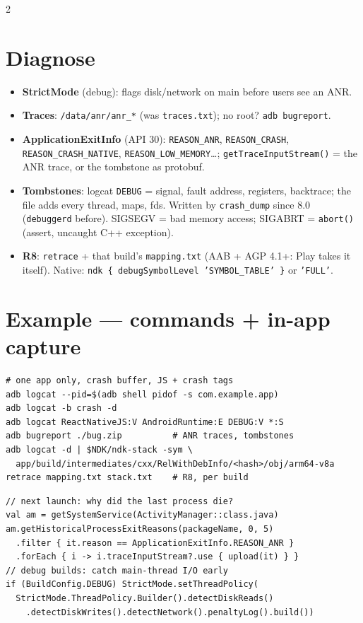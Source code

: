 \documentclass[8pt]{extarticle}
\begin{document}
\begin{multicols}{2}
\section{Diagnose}
\begin{itemize}\raggedright
  \item \textbf{StrictMode} (debug): flags disk/network on main before users see an ANR.
  \item \textbf{Traces}: \texttt{/data/anr/anr\_*} (was \texttt{traces.txt}); no root? \texttt{adb bugreport}.
  \item \textbf{ApplicationExitInfo} (API 30): \texttt{REASON\_ANR},
        \texttt{REASON\_CRASH}, \texttt{REASON\_CRASH\_NATIVE}, \texttt{REASON\_LOW\_MEMORY}…;
        \texttt{getTraceInputStream()} = the ANR trace, or the tombstone as protobuf.
  \item \textbf{Tombstones}: logcat \texttt{DEBUG} = signal, fault address, registers,
        backtrace; the file adds every thread, maps, fds. Written by \texttt{crash\_dump}
        since 8.0 (\texttt{debuggerd} before).
        SIGSEGV = bad memory access; SIGABRT = \texttt{abort()} (assert, uncaught C++ exception).
  \item \textbf{R8}: \texttt{retrace} + that build's \texttt{mapping.txt} (AAB + AGP 4.1+: Play
        takes it itself). Native: \texttt{ndk \{ debugSymbolLevel 'SYMBOL\_TABLE' \}} or \texttt{'FULL'}.
\end{itemize}

\columnbreak

\section{Example — commands + in-app capture}
\begin{lstlisting}[language=KtSheet]
# one app only, crash buffer, JS + crash tags
adb logcat --pid=$(adb shell pidof -s com.example.app)
adb logcat -b crash -d
adb logcat ReactNativeJS:V AndroidRuntime:E DEBUG:V *:S
adb bugreport ./bug.zip          # ANR traces, tombstones
adb logcat -d | $NDK/ndk-stack -sym \
  app/build/intermediates/cxx/RelWithDebInfo/<hash>/obj/arm64-v8a
retrace mapping.txt stack.txt    # R8, per build
\end{lstlisting}
\begin{lstlisting}[language=KtSheet]
// next launch: why did the last process die?
val am = getSystemService(ActivityManager::class.java)
am.getHistoricalProcessExitReasons(packageName, 0, 5)
  .filter { it.reason == ApplicationExitInfo.REASON_ANR }
  .forEach { i -> i.traceInputStream?.use { upload(it) } }
// debug builds: catch main-thread I/O early
if (BuildConfig.DEBUG) StrictMode.setThreadPolicy(
  StrictMode.ThreadPolicy.Builder().detectDiskReads()
    .detectDiskWrites().detectNetwork().penaltyLog().build())
\end{lstlisting}


\end{multicols}
\end{document}

